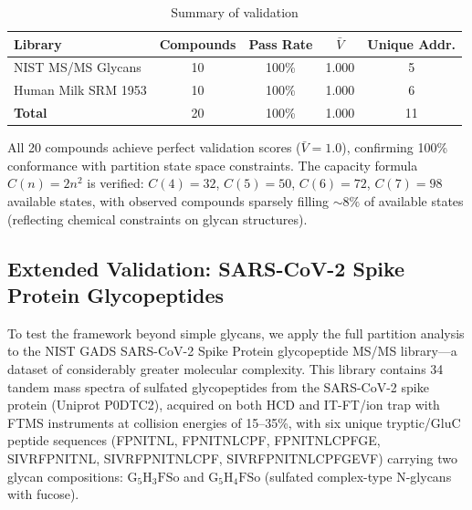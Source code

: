 \documentclass[twocolumn,10pt,a4paper]{article}
\theoremstyle{definition}
\theoremstyle{remark}
\begin{document}
\begin{table}[H]
\centering
\caption{Summary of validation}
\label{tab:summary}
\small
\begin{tabular}{lcccc}
\toprule
\textbf{Library} & \textbf{Compounds} & \textbf{Pass Rate} & $\bar{V}$ & \textbf{Unique Addr.} \\
\midrule
NIST MS/MS Glycans & 10 & 100\% & 1.000 & 5 \\
Human Milk SRM 1953 & 10 & 100\% & 1.000 & 6 \\
\midrule
\textbf{Total} & 20 & 100\% & 1.000 & 11 \\
\bottomrule
\end{tabular}
\end{table}

All 20 compounds achieve perfect validation scores ($\bar{V} = 1.0$), confirming 100\% conformance with partition state space constraints. The capacity formula $C(n) = 2n^2$ is verified: $C(4) = 32$, $C(5) = 50$, $C(6) = 72$, $C(7) = 98$ available states, with observed compounds sparsely filling $\sim 8\%$ of available states (reflecting chemical constraints on glycan structures).

\subsection{Extended Validation: SARS-CoV-2 Spike Protein Glycopeptides}
\label{sec:spike}

To test the framework beyond simple glycans, we apply the full partition analysis to the NIST GADS SARS-CoV-2 Spike Protein glycopeptide MS/MS library---a dataset of considerably greater molecular complexity. This library contains 34 tandem mass spectra of sulfated glycopeptides from the SARS-CoV-2 spike protein (Uniprot P0DTC2), acquired on both HCD and IT-FT/ion trap with FTMS instruments at collision energies of 15--35\%, with six unique tryptic/GluC peptide sequences (FPNITNL, FPNITNLCPF, FPNITNLCPFGE, SIVRFPNITNL, SIVRFPNITNLCPF, SIVRFPNITNLCPFGEVF) carrying two glycan compositions: $\text{G}_5\text{H}_3\text{F}\text{So}$ and $\text{G}_5\text{H}_4\text{F}\text{So}$ (sulfated complex-type N-glycans with fucose).
\end{document}

